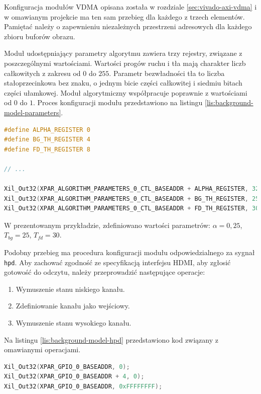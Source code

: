 Konfiguracja modułów VDMA opisana została w rozdziale \ref{sec:vivado-axi-vdma} i w omawianym projekcie ma ten sam przebieg dla każdego z trzech elementów. Pamiętać należy o zapewnieniu niezależnych przestrzeni adresowych dla każdego zbioru buforów obrazu.

Moduł udostępniający parametry algorytmu zawiera trzy rejestry, związane z poszczególnymi wartościami. Wartości progów ruchu i tła mają charakter liczb całkowitych z zakresu od $0$ do $255$. Parametr bezwładności tła to liczba stałoprzecinkowa bez znaku, o jednym bicie części całkowitej i siedmiu bitach części ułamkowej. Moduł algorytmiczny współpracuje poprawnie z wartościami od $0$ do $1$. Proces konfiguracji modułu przedstawiono na listingu \ref{lis:background-model-parameters}.

\begin{lstlisting}[breaklines,language=C, label=lis:background-model-parameters, caption=Konfiguracja modułu parametryzującego generację tła.]
#define ALPHA_REGISTER 0
#define BG_TH_REGISTER 4
#define FD_TH_REGISTER 8

// ...

Xil_Out32(XPAR_ALGORITHM_PARAMETERS_0_CTL_BASEADDR + ALPHA_REGISTER, 32); // 00100000 = 0.25
Xil_Out32(XPAR_ALGORITHM_PARAMETERS_0_CTL_BASEADDR + BG_TH_REGISTER, 25);
Xil_Out32(XPAR_ALGORITHM_PARAMETERS_0_CTL_BASEADDR + FD_TH_REGISTER, 30);
\end{lstlisting}

W prezentowanym przykładzie, zdefiniowano wartości parametrów: $\alpha = 0,25$, $T_{bg} = 25$, $T_{fd} = 30$.

Podobny przebieg ma procedura konfiguracji modułu odpowiedzialnego za sygnał \texttt{hpd}. Aby zachować zgodność ze specyfikacją interfejsu HDMI, aby zgłosić gotowość do odczytu, należy przeprowadzić następujące operacje:
\begin{enumerate}
	\item Wymuszenie stanu niskiego kanału.
	\item Zdefiniowanie kanału jako wejściowy.
	\item Wymuszenie stanu wysokiego kanału.
\end{enumerate}

Na listingu \ref{lis:background-model-hpd} przedstawiono kod związany z omawianymi operacjami.

\begin{lstlisting}[breaklines,language=C, label=lis:background-model-hpd, caption=Konfiguracja modułu sterującego kanałem \texttt{hpd}.]
Xil_Out32(XPAR_GPIO_0_BASEADDR, 0);
Xil_Out32(XPAR_GPIO_0_BASEADDR + 4, 0);
Xil_Out32(XPAR_GPIO_0_BASEADDR, 0xFFFFFFFF);
\end{lstlisting}


